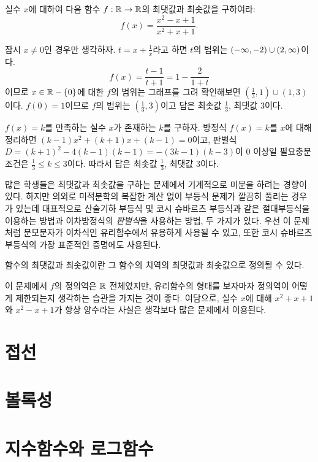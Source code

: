 \documentclass[11pt]{amsbook}
\makeatletter
\newcommand{\+}{\begin{center}$\cdot\qquad\cdot\qquad\cdot\qquad\cdot\qquad\cdot$\end{center}}
\let\@@section\section
\renewcommand{\section}{\newpage\@@section}
\makeatother
\begin{document}
\begin{prb}
실수 $x$에 대하여 다음 함수 $f:\R\to\R$의 최댓값과 최솟값을 구하여라:
\[f(x)=\frac{x^2-x+1}{x^2+x+1}.\]
\end{prb}
\begin{sol}[1]
잠시 $x\ne0$인 경우만 생각하자.
$t=x+\frac1x$라고 하면 $t$의 범위는 $(-\infty,-2)\cup(2,\infty)$이다.
\[f(x)=\frac{t-1}{t+1}=1-\frac2{1+t}\]이므로 $x\in\mathbb{R}-\{0\}$에 대한 $f$의 범위는 그래프를 그려 확인해보면 $\left(\tfrac13,1\right)\cup(1,3)$이다.
$f(0)=1$이므로 $f$의 범위는 $\left(\tfrac13,3\right)$이고 답은 최솟값 $\frac13$, 최댓값 3이다.
\end{sol}
\begin{sol}[2]
$f(x)=k$를 만족하는 실수 $x$가 존재하는 $k$를 구하자.
방정식 $f(x)=k$를 $x$에 대해 정리하면 $(k-1)x^2+(k+1)x+(k-1)=0$이고, 판별식 $D=(k+1)^2-4(k-1)(k-1)=-(3k-1)(k-3)$이 0 이상일 필요충분조건은 $\frac13\le k\le 3$이다.
따라서 답은 최솟값 $\frac13$, 최댓값 3이다.
\end{sol}
\begin{note}[1]
많은 학생들은 최댓값과 최솟값을 구하는 문제에서 기계적으로 미분을 하려는 경향이 있다.
하지만 의외로 미적분학의 복잡한 계산 없이 부등식 문제가 깔끔히 풀리는 경우가 있는데 대표적으로 산술기하 부등식 및 코시 슈바르츠 부등식과 같은 절대부등식을 이용하는 방법과 이차방정식의 \emph{판별식}을 사용하는 방법, 두 가지가 있다.
우선 이 문제처럼 분모분자가 이차식인 유리함수에서 유용하게 사용될 수 있고, 또한 코시 슈바르츠 부등식의 가장 표준적인 증명에도 사용된다.
\end{note}
\begin{note}[2]
함수의 최댓값과 최솟값이란 그 함수의 치역의 최댓값과 최솟값으로 정의될 수 있다.
\end{note}
\begin{note}[3]
이 문제에서 $f$의 정의역은 $\mathbb{R}$ 전체였지만, 유리함수의 형태를 보자마자 정의역이 어떻게 제한되는지 생각하는 습관을 가지는 것이 좋다.
여담으로, 실수 $x$에 대해 $x^2+x+1$와 $x^2-x+1$가 항상 양수라는 사실은 생각보다 많은 문제에서 이용된다.
\end{note}

\section{접선}

\section{볼록성}

\section{지수함수와 로그함수}
\end{document}
